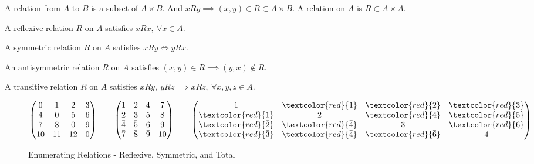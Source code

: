 \begin{definition}[relation]
	A relation from $A$ to $B$ is a subset of $A \times B$.
	And $xRy \implies (x,y) \in R \subset A \times B$.
	A relation on $A$ is $R \subset A \times A$.
\end{definition}

\begin{definition}[reflexive]
	A reflexive relation $R$ on $A$ satisfies $xRx,\ \forall x \in A$.
\end{definition}

\begin{definition}[symmetric]
	A symmetric relation $R$ on $A$ satisfies $xRy \iff yRx$.
\end{definition}

\begin{definition}[antisymmetric]
	An antisymmetric relation $R$ on $A$ satisfies $(x,y) \in R \implies (y,x) \notin R$.
\end{definition}

\begin{definition}[transitive]
	A transitive relation $R$ on $A$ satisfies $xRy,\ yRz \implies xRz,\ \forall x,y,z \in A$.
\end{definition}

\begin{figure}[h]
	\centering
	\[ \begin{pmatrix} 0 & 1 & 2 & 3 \\ 4 & 0 & 5 & 6 \\ 7 & 8 & 0 & 9 \\ 10 & 11 & 12 & 0 \end{pmatrix} \qquad \begin{pmatrix} 1 & 2 & 4 & 7 \\ \bar{2} & 3 & 5 & 8 \\ \bar{4} & \bar{5} & 6 & 9 \\ \bar{7} & \bar{8} & \bar{9} & 10 \end{pmatrix} \qquad \begin{pmatrix} 1 & \textcolor{red}{1} & \textcolor{red}{2} & \textcolor{red}{3} \\ \textcolor{red}{\bar{1}} & 2 & \textcolor{red}{4} & \textcolor{red}{5} \\ \textcolor{red}{\bar{2}} & \textcolor{red}{\bar{4}} & 3 & \textcolor{red}{6} \\ \textcolor{red}{\bar{3}} & \textcolor{red}{\bar{4}} & \textcolor{red}{\bar{6}} & 4 \end{pmatrix} \]
	\caption{Enumerating Relations - Reflexive, Symmetric, and Total}
\end{figure}

